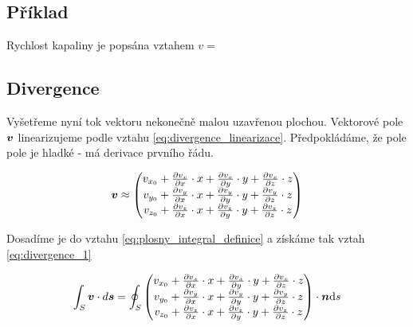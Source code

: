 \subsection{Příklad}

Rychlost kapaliny je popsána vztahem \(v = \)

\subsection{Divergence}
\label{sec:divergence}

Vyšetřeme nyní tok vektoru nekonečně malou uzavřenou plochou. Vektorové pole \(\boldsymbol{v}\) linearizujeme podle vztahu \eqref{eq:divergence_linearizace}.
Předpokládáme, že pole pole je hladké - má derivace prvního řádu.

\begin{equation}
\label{eq:divergence_linearizace}
\boldsymbol{v} \approx \begin{pmatrix}
v_{x_0} + \frac{\partial v_x}{\partial x} \cdot x + \frac{\partial v_x}{\partial y} \cdot y + \frac{\partial v_x}{\partial z} \cdot z \\
v_{y_0} + \frac{\partial v_y}{\partial x} \cdot x + \frac{\partial v_y}{\partial y} \cdot y + \frac{\partial v_y}{\partial z} \cdot z \\
v_{z_0} + \frac{\partial v_z}{\partial x} \cdot x + \frac{\partial v_z}{\partial y} \cdot y + \frac{\partial v_z}{\partial z} \cdot z
\end{pmatrix}
\end{equation}

Dosadíme je do vztahu \eqref{eq:plosny_integral_definice} a získáme tak vztah \eqref{eq:divergence_1}

\begin{equation}
\label{eq:divergence_1}
\begin{split}
\int_S \boldsymbol{v} \cdot d\boldsymbol{s} = \oint_S \begin{pmatrix}
v_{x_0} + \frac{\partial v_x}{\partial x} \cdot x + \frac{\partial v_x}{\partial y} \cdot y + \frac{\partial v_x}{\partial z} \cdot z \\
v_{y_0} + \frac{\partial v_y}{\partial x} \cdot x + \frac{\partial v_y}{\partial y} \cdot y + \frac{\partial v_y}{\partial z} \cdot z \\
v_{z_0} + \frac{\partial v_z}{\partial x} \cdot x + \frac{\partial v_z}{\partial y} \cdot y + \frac{\partial v_z}{\partial z} \cdot z
\end{pmatrix} \cdot \boldsymbol{n} \mathrm{d}s
\end{split}
\end{equation}

